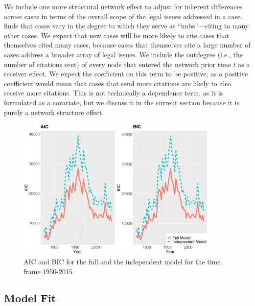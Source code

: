 \documentclass[headsepline=true, abstracton]{scrartcl}
\begin{document}
We include one more structural network effect to adjust for inherent differences across cases in terms of the overall scope of the legal issues addressed in a case.  \citet{fowler2008authority} finds that cases vary in the degree to which they serve as ``hubs''---citing to many other cases. We expect that new cases will be more likely to cite cases that themselves cited many cases, because cases that themselves cite a large number of cases address a broader array of legal issues. We include the outdegree (i.e., the number of citations sent) of every node that entered the network prior time $t$ as a receiver effect. We expect the coefficient on this term to be positive, as a positive coefficient would mean that cases that send more citations are likely to also receive more citations. This is not technically a dependence term, as it is formulated as a covariate, but we discuss it in the current section because it is purely a network structure effect.







\begin{figure}[bt]
	\centering
	\includegraphics[width=10cm ]{SCC_AIC_BIC.pdf}
	\caption{AIC and BIC for the full and the independent model for the time frame 1950-2015 }
	\label{AIC_BIC}
\end{figure}

\subsection{Model Fit}
\end{document}
